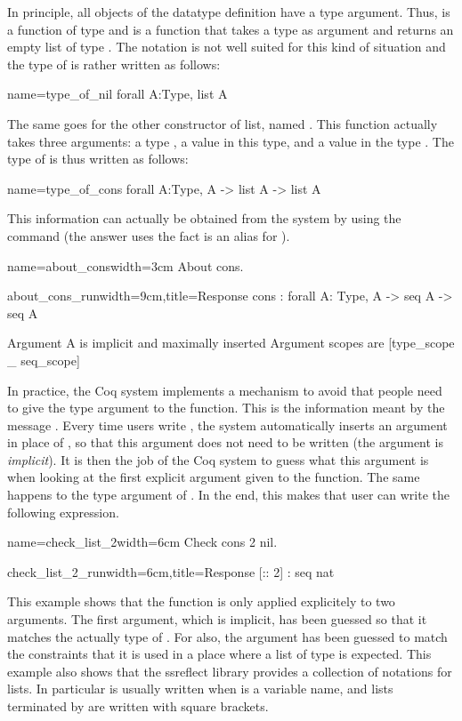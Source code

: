 In principle, all objects of the datatype definition have a type
argument.  Thus,  is a function of type  and
 is a function that takes a type  as argument and returns
an empty list of type .  The notation  is not
well suited for this kind of situation and the type of  is
rather written as follows:

\begin{coq}{name=type_of_nil}{}
  forall A:Type, list A
\end{coq}
The same goes for the other constructor of list, named .  This
function actually takes three arguments: a type , a value in this
type, and a value in the type .  The type of  is
thus written as follows:

\begin{coq}{name=type_of_cons}{}
  forall A:Type, A -> list A -> list A
\end{coq}
This information can actually be obtained from the system by using the 
command  (the answer uses the fact  is an alias for ).

\begin{coq}{name=about_cons}{width=3cm}
About cons.
$~$
$~$
$~$
\end{coq}
\begin{coqout}{about_cons_run}{width=9cm,title=Response}
cons : forall A: Type, A -> seq A -> seq A

Argument A is implicit and maximally inserted
Argument scopes are [type_scope _ seq_scope]
\end{coqout}
In practice, the Coq system implements a mechanism to avoid that
people need to give the type argument to the  function.  This is
the information meant by the message .  Every time users write , the system automatically
inserts an argument in place of , so that this argument does not
need to be written (the argument is {\em implicit}).  It is then the
job of the Coq system to guess what this argument is when looking at
the first explicit argument given to the function.  The same happens
to the type argument of .  In the end, this makes that user can
write the following expression.

\begin{coq}{name=check_list_2}{width=6cm}
Check cons 2 nil.
\end{coq}
\begin{coqout}{check_list_2_run}{width=6cm,title=Response}
[:: 2] : seq nat
\end{coqout}
This example shows that the function  is only applied
explicitely to two arguments.  The first argument, which is implicit,
has been guessed so that it matches the actually type of .  For 
 also, the argument has been guessed to match the constraints
that it is used in a place where a list of type  is expected.  This example also shows that the ssreflect
library provides a collection of notations for lists.  In particular
 is usually written  when  is a variable
name, and lists terminated by  are written with square brackets.

